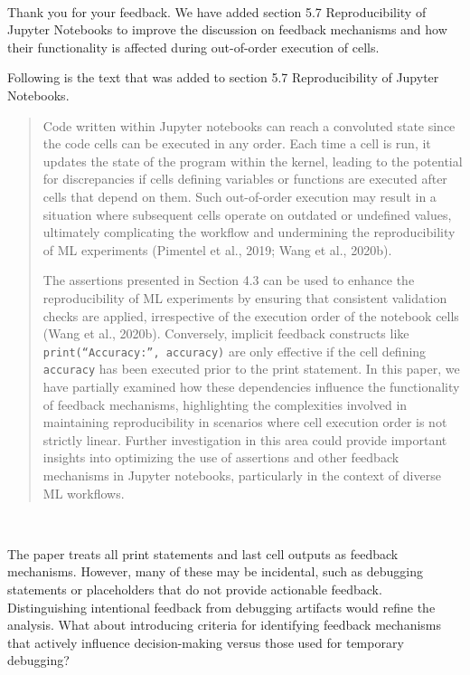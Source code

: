 \documentclass[11pt,fleqn]{article}
\newcommand{\eline}{\vspace*{.75\baselineskip}}
\newcommand{\Referee}[1]{\eline \noindent {\bf Reviewer comment #1:} \\}
\newcommand{\Us}{\eline \noindent {\bf Response:}\\}
\newenvironment{revcomment}[1][]
{\Referee{#1}\begin{rcomment}}
{\end{rcomment}}
\begin{document}
\Us Thank you for your feedback. We have added section 5.7 Reproducibility of Jupyter Notebooks to improve the discussion on feedback mechanisms and how their functionality is affected during out-of-order execution of cells.

Following is the text that was added to section 5.7 Reproducibility of Jupyter Notebooks.

\begin{quote}
  Code written within Jupyter notebooks can reach a convoluted state since the code cells can be executed in any order. Each time a cell is run, it updates the state of the program within the kernel, leading to the potential for discrepancies if cells defining variables or functions are executed after cells that depend on them. Such out-of-order execution may result in a situation where subsequent cells operate on outdated or undefined values, ultimately complicating the workflow and undermining the reproducibility of ML experiments (Pimentel et al., 2019; Wang et al., 2020b).

  The assertions presented in Section 4.3 can be used to enhance the reproducibility of ML experiments by ensuring that consistent validation checks are applied, irrespective of the execution order of the notebook cells (Wang et al., 2020b). Conversely, implicit feedback constructs like \texttt{print(``Accuracy:'', accuracy)} are only effective if the cell defining \texttt{accuracy} has been executed prior to the print statement. In this paper, we have partially examined how these dependencies influence the functionality of feedback mechanisms, highlighting the complexities involved in maintaining reproducibility in scenarios where cell execution order is not strictly linear. Further investigation in this area could provide important insights into optimizing the use of assertions and other feedback mechanisms in Jupyter notebooks, particularly in the context of diverse ML workflows.
\end{quote}

\begin{revcomment}[2.8]
  The paper treats all print statements and last cell outputs as feedback mechanisms. However, many of these may be incidental, such as debugging statements or placeholders that do not provide actionable feedback. Distinguishing intentional feedback from debugging artifacts would refine the analysis. What about introducing criteria for identifying feedback mechanisms that actively influence decision-making versus those used for temporary debugging?
\end{revcomment}
\end{document}
